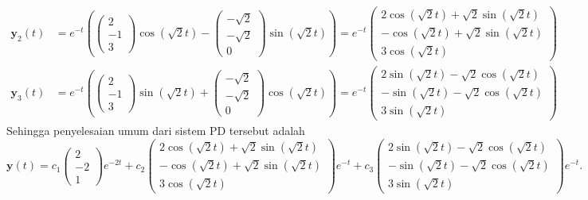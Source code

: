 \documentclass[a4paper]{article}
\theoremstyle{definisi}
\numberwithin{equation}{section}
\begin{document}
\begin{enumerate}
\begin{align*}
      \mathbf{y}_2(t) &= e^{-t}\left(\begin{pmatrix}2\\-1\\3\end{pmatrix}\cos(\sqrt{2}t) - \begin{pmatrix}-\sqrt{2}\\-\sqrt{2}\\0\end{pmatrix}\sin(\sqrt{2}t)\right)=e^{-t}\begin{pmatrix}2\cos(\sqrt{2}t)+\sqrt{2}\sin(\sqrt{2}t)\\-\cos(\sqrt{2}t)+\sqrt{2}\sin(\sqrt{2}t)\\3\cos(\sqrt{2}t)\end{pmatrix}\\
      \mathbf{y}_3(t) &= e^{-t}\left(\begin{pmatrix}2\\-1\\3\end{pmatrix}\sin(\sqrt{2}t) + \begin{pmatrix}-\sqrt{2}\\-\sqrt{2}\\0\end{pmatrix}\cos(\sqrt{2}t)\right)=e^{-t}\begin{pmatrix}2\sin(\sqrt{2}t)-\sqrt{2}\cos(\sqrt{2}t)\\-\sin(\sqrt{2}t)-\sqrt{2}\cos(\sqrt{2}t)\\3\sin(\sqrt{2}t)\end{pmatrix}
    \end{align*} 
    Sehingga penyelesaian umum dari sistem PD tersebut adalah
    \[\mathbf{y}(t) = c_1\begin{pmatrix}2\\-2\\1\end{pmatrix}e^{-2t} + c_2\begin{pmatrix}2\cos(\sqrt{2}t)+\sqrt{2}\sin(\sqrt{2}t)\\-\cos(\sqrt{2}t)+\sqrt{2}\sin(\sqrt{2}t)\\3\cos(\sqrt{2}t)\end{pmatrix}e^{-t} + c_3\begin{pmatrix}2\sin(\sqrt{2}t)-\sqrt{2}\cos(\sqrt{2}t)\\-\sin(\sqrt{2}t)-\sqrt{2}\cos(\sqrt{2}t)\\3\sin(\sqrt{2}t)\end{pmatrix}e^{-t}.\]


\end{enumerate}
\end{document}
